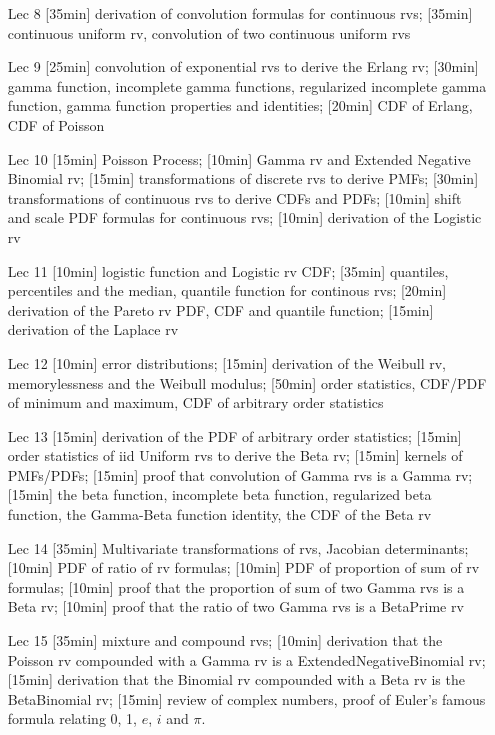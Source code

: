 \documentclass[12pt]{article}
\begin{document}
\begin{enumerate}
\item[Lec 8] [35min] derivation of convolution formulas for continuous rvs; [35min] continuous uniform rv, convolution of two continuous uniform rvs

\item[Lec 9] [25min] convolution of exponential rvs to derive the Erlang rv; [30min] gamma function, incomplete gamma functions, regularized incomplete gamma function, gamma function properties and identities; [20min] CDF of Erlang, CDF of Poisson

\item[Lec 10] [15min] Poisson Process; [10min] Gamma rv and Extended Negative Binomial rv; [15min] transformations of discrete rvs to derive PMFs; [30min] transformations of continuous rvs to derive CDFs and PDFs; [10min] shift and scale PDF formulas for continuous rvs; [10min] derivation of the Logistic rv

\item[Lec 11] [10min] logistic function and Logistic rv CDF; [35min] quantiles, percentiles and the median, quantile function for continous rvs; [20min] derivation of the Pareto rv PDF, CDF and quantile function; [15min] derivation of the Laplace rv

\item[Lec 12] [10min] error distributions; [15min] derivation of the Weibull rv, memorylessness and the Weibull modulus; [50min] order statistics, CDF/PDF of minimum and maximum, CDF of arbitrary order statistics

\item[Lec 13] [15min] derivation of the PDF of arbitrary order statistics; [15min] order statistics of iid Uniform rvs to derive the Beta rv; [15min] kernels of PMFs/PDFs; [15min] proof that convolution of Gamma rvs is a Gamma rv; [15min] the beta function, incomplete beta function, regularized beta function, the Gamma-Beta function identity, the CDF of the Beta rv

\item[Lec 14] [35min] Multivariate transformations of rvs, Jacobian determinants; [10min] PDF of ratio of rv formulas; [10min] PDF of proportion of sum of rv formulas; [10min] proof that the proportion of sum of two Gamma rvs is a Beta rv; [10min] proof that the ratio of two Gamma rvs is a BetaPrime rv

\item[Lec 15] [35min] mixture and compound rvs; [10min] derivation that the Poisson rv compounded with a Gamma rv is a ExtendedNegativeBinomial rv; [15min] derivation that the Binomial rv compounded with a Beta rv is the BetaBinomial rv; [15min] review of complex numbers, proof of Euler's famous formula relating 0, 1, $e$, $i$ and $\pi$.


\end{enumerate}
\end{document}
